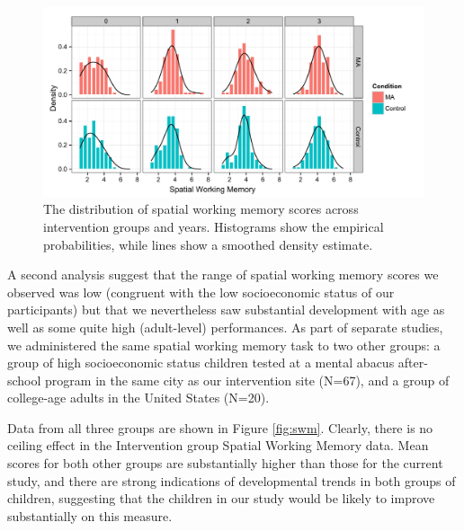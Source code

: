 \documentclass[11pt]{article}
\begin{document}
\begin{figure}[H]
\begin{center}
\includegraphics[width=6.5in]{figures/swmdensities.pdf}
\end{center}
\caption{The distribution of spatial working memory scores across intervention groups and years. Histograms show the empirical probabilities, while lines show a smoothed density estimate.}
\label{fig:densities}
\end{figure}

A second analysis suggest that the range of spatial working memory scores we observed was low (congruent with the low socioeconomic status of our participants) but that we nevertheless saw substantial development with age as well as some quite high (adult-level) performances. As part of separate studies, we administered the same spatial working memory task to two other groups: a group of high socioeconomic status children tested at a mental abacus after-school program in the same city as our intervention site (N=67), and a group of college-age adults in the United States (N=20). 

Data from all three groups are shown in Figure \ref{fig:swm}. Clearly, there is no ceiling effect in the Intervention group Spatial Working Memory data. Mean scores for both other groups are substantially higher than those for the current study, and there are strong indications of developmental trends in both groups of children, suggesting that the children in our study would be likely to improve substantially on this measure. 
\end{document}
